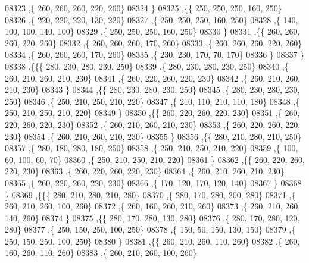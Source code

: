 \begin{DoxyCode}
08323     ,\{   260,   260,   260,   220,   260\}
08324     \}
08325    ,\{\{   250,   250,   250,   160,   250\}
08326     ,\{   220,   220,   220,   130,   220\}
08327     ,\{   250,   250,   250,   160,   250\}
08328     ,\{   140,   100,   100,   140,   100\}
08329     ,\{   250,   250,   250,   160,   250\}
08330     \}
08331    ,\{\{   260,   260,   260,   220,   260\}
08332     ,\{   260,   260,   260,   170,   260\}
08333     ,\{   260,   260,   260,   220,   260\}
08334     ,\{   260,   260,   260,   170,   260\}
08335     ,\{   230,   230,   170,    70,   170\}
08336     \}
08337    \}
08338   ,\{\{\{   280,   230,   280,   230,   250\}
08339     ,\{   280,   230,   280,   230,   250\}
08340     ,\{   260,   210,   260,   210,   230\}
08341     ,\{   260,   220,   260,   220,   230\}
08342     ,\{   260,   210,   260,   210,   230\}
08343     \}
08344    ,\{\{   280,   230,   280,   230,   250\}
08345     ,\{   280,   230,   280,   230,   250\}
08346     ,\{   250,   210,   250,   210,   220\}
08347     ,\{   210,   110,   210,   110,   180\}
08348     ,\{   250,   210,   250,   210,   220\}
08349     \}
08350    ,\{\{   260,   220,   260,   220,   230\}
08351     ,\{   260,   220,   260,   220,   230\}
08352     ,\{   260,   210,   260,   210,   230\}
08353     ,\{   260,   220,   260,   220,   230\}
08354     ,\{   260,   210,   260,   210,   230\}
08355     \}
08356    ,\{\{   280,   210,   280,   210,   250\}
08357     ,\{   280,   180,   280,   180,   250\}
08358     ,\{   250,   210,   250,   210,   220\}
08359     ,\{   100,    60,   100,    60,    70\}
08360     ,\{   250,   210,   250,   210,   220\}
08361     \}
08362    ,\{\{   260,   220,   260,   220,   230\}
08363     ,\{   260,   220,   260,   220,   230\}
08364     ,\{   260,   210,   260,   210,   230\}
08365     ,\{   260,   220,   260,   220,   230\}
08366     ,\{   170,   120,   170,   120,   140\}
08367     \}
08368    \}
08369   ,\{\{\{   280,   210,   280,   210,   280\}
08370     ,\{   280,   170,   280,   200,   280\}
08371     ,\{   260,   210,   260,   100,   260\}
08372     ,\{   260,   160,   260,   210,   260\}
08373     ,\{   260,   210,   260,   140,   260\}
08374     \}
08375    ,\{\{   280,   170,   280,   130,   280\}
08376     ,\{   280,   170,   280,   120,   280\}
08377     ,\{   250,   150,   250,   100,   250\}
08378     ,\{   150,    50,   150,   130,   150\}
08379     ,\{   250,   150,   250,   100,   250\}
08380     \}
08381    ,\{\{   260,   210,   260,   110,   260\}
08382     ,\{   260,   160,   260,   110,   260\}
08383     ,\{   260,   210,   260,   100,   260\}

\end{DoxyCode}

